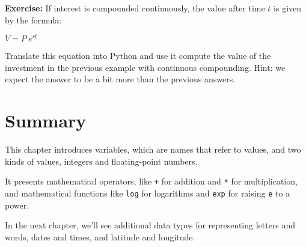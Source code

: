 \textbf{Exercise:} If interest is compounded continuously, the value
after time \(t\) is given by the formula:

\(V=P~e^{rt}\)

Translate this equation into Python and use it compute the value of the
investment in the previous example with continuous compounding. Hint: we
expect the answer to be a bit more than the previous answers.

\hypertarget{summary}{%
\section{Summary}\label{summary}}

This chapter introduces variables, which are names that refer to values,
and two kinds of values, integers and floating-point numbers.

It presents mathematical operators, like \passthrough{\lstinline!+!} for
addition and \passthrough{\lstinline!*!} for multiplication, and
mathematical functions like \passthrough{\lstinline!log!} for logarithms
and \passthrough{\lstinline!exp!} for raising
\passthrough{\lstinline!e!} to a power.

In the next chapter, we'll see additional data types for representing
letters and words, dates and times, and latitude and longitude.

